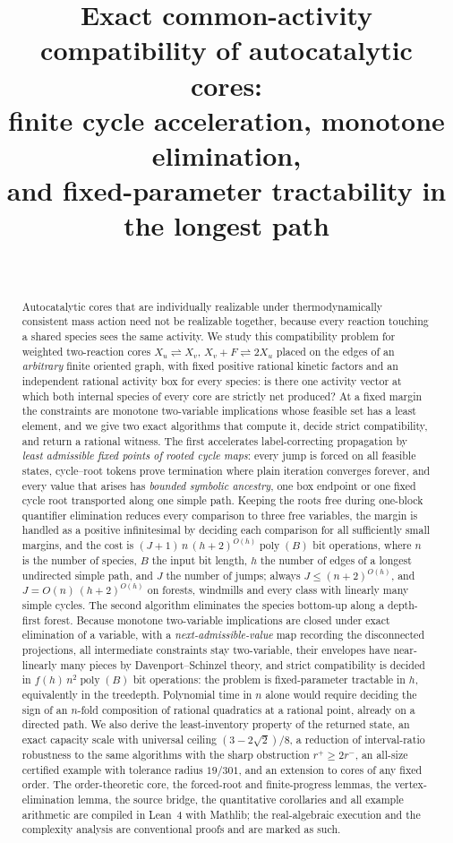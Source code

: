 \documentclass[11pt,a4paper]{article}
\title{Exact common-activity compatibility of autocatalytic cores:\\ finite cycle acceleration, monotone elimination,\\ and fixed-parameter tractability in the longest path}
\author{\PaperAuthor\\ \PaperAffiliation}
\date{\PaperDate}
\theoremstyle{plain}
\theoremstyle{definition}
\theoremstyle{remark}
\newcommand{\rev}{\rightleftharpoons}
\newcommand{\poly}{\operatorname{poly}}
\begin{document}
\maketitle

\begin{abstract}
Autocatalytic cores that are individually realizable under thermodynamically consistent mass action need not be realizable together, because every reaction touching a shared species sees the same activity. We study this compatibility problem for weighted two-reaction cores $X_u\rev X_v$, $X_v+F\rev 2X_u$ placed on the edges of an \emph{arbitrary} finite oriented graph, with fixed positive rational kinetic factors and an independent rational activity box for every species: is there one activity vector at which both internal species of every core are strictly net produced? At a fixed margin the constraints are monotone two-variable implications whose feasible set has a least element, and we give two exact algorithms that compute it, decide strict compatibility, and return a rational witness. The first accelerates label-correcting propagation by \emph{least admissible fixed points of rooted cycle maps}: every jump is forced on all feasible states, cycle--root tokens prove termination where plain iteration converges forever, and every value that arises has \emph{bounded symbolic ancestry}, one box endpoint or one fixed cycle root transported along one simple path. Keeping the roots free during one-block quantifier elimination reduces every comparison to three free variables, the margin is handled as a positive infinitesimal by deciding each comparison for all sufficiently small margins, and the cost is $(J+1)\,n\,(h+2)^{O(h)}\poly(B)$ bit operations, where $n$ is the number of species, $B$ the input bit length, $h$ the number of edges of a longest undirected simple path, and $J$ the number of jumps; always $J\le(n+2)^{O(h)}$, and $J=O(n)\,(h+2)^{O(h)}$ on forests, windmills and every class with linearly many simple cycles. The second algorithm eliminates the species bottom-up along a depth-first forest. Because monotone two-variable implications are closed under exact elimination of a variable, with a \emph{next-admissible-value} map recording the disconnected projections, all intermediate constraints stay two-variable, their envelopes have near-linearly many pieces by Davenport--Schinzel theory, and strict compatibility is decided in $f(h)\,n^2\poly(B)$ bit operations: the problem is fixed-parameter tractable in $h$, equivalently in the treedepth. Polynomial time in $n$ alone would require deciding the sign of an $n$-fold composition of rational quadratics at a rational point, already on a directed path. We also derive the least-inventory property of the returned state, an exact capacity scale with universal ceiling $(3-2\sqrt2)/8$, a reduction of interval-ratio robustness to the same algorithms with the sharp obstruction $r^+\ge2r^-$, an all-size certified example with tolerance radius $19/301$, and an extension to cores of any fixed order. The order-theoretic core, the forced-root and finite-progress lemmas, the vertex-elimination lemma, the source bridge, the quantitative corollaries and all example arithmetic are compiled in Lean~4 with Mathlib; the real-algebraic execution and the complexity analysis are conventional proofs and are marked as such.

\end{abstract}
\end{document}

